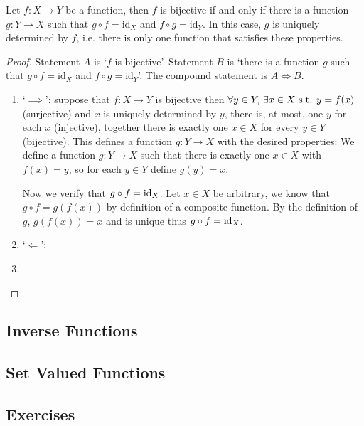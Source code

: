 \begin{proposition}
    Let $f: X \to Y$ be a function, then $f$ is bijective if and only if there is a function $g : Y \to X$ such that $g \circ f = \text{id}_X$ and \(f \circ g = \text{id}_Y\). In this case, \(g\) is uniquely determined by \(f\), i.e. there is only one function that satisfies these properties.

    \begin{proof} Statement \(A\) is `$f$ is bijective'. Statement \(B\) is `there is a function \(g\) such that $g \circ f = \text{id}_X$ and \(f \circ g = \text{id}_Y\)'. The compound statement is \(A \iff B\).
        \begin{enumerate}[label=(\roman*)]
            \item `\(\implies\)': suppose that \(f: X \to Y\) is bijective then \(\forall y \in Y, \, \exists x \in X \text{ s.t. } y = f(x)\) (surjective) and \(x\) is uniquely determined by \(y\), there is, at most, one \(y\) for each \(x\) (injective), together there is exactly one \(x \in X\) for every \(y \in Y\) (bijective). This defines a function \(g : Y \to X\) with the desired properties: We define a function \(g: Y \to X\) such that there is exactly one \(x \in X\) with \(f(x) = y\), so for each \(y \in Y\) define \(g(y) = x\). 
            
            Now we verify that \(g \circ f = \text{id}_X\). Let \(x \in X\) be arbitrary, we know that \(g \circ f = g(f(x))\) by definition of a composite function. By the definition of \(g\), \(g(f(x)) = x\) and is unique thus \(g \circ f = \text{id}_X\).

            \item `\(\Longleftarrow\)':
            
            \item
        \end{enumerate}
    \end{proof}
\end{proposition}


\subsection{Inverse Functions}

\subsection{Set Valued Functions}

\subsection*{Exercises}
